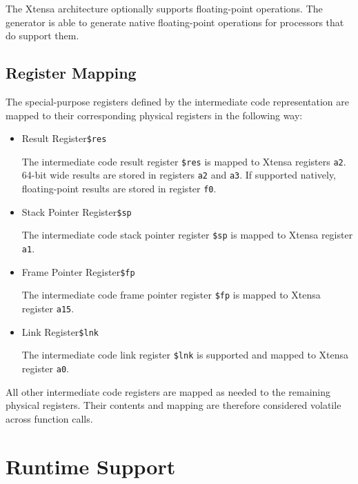 The Xtensa architecture optionally supports floating-point operations.
The generator is able to generate native floating-point operations for processors that do support them.

\subsection{Register Mapping}

The special-purpose registers defined by the intermediate code representation are mapped to their corresponding physical registers in the following way:

\begin{itemize}

\item Result Register\alignright\texttt{\$res}\nopagebreak

The intermediate code result register \texttt{\$res} is mapped to Xtensa registers \texttt{a2}.
64-bit wide results are stored in registers \texttt{a2} and \texttt{a3}.
If supported natively, floating-point results are stored in register \texttt{f0}.

\item Stack Pointer Register\alignright\texttt{\$sp}\nopagebreak

The intermediate code stack pointer register \texttt{\$sp} is mapped to Xtensa register \texttt{a1}.

\item Frame Pointer Register\alignright\texttt{\$fp}\nopagebreak

The intermediate code frame pointer register \texttt{\$fp} is mapped to Xtensa register \texttt{a15}.

\item Link Register\alignright\texttt{\$lnk}\nopagebreak

The intermediate code link register \texttt{\$lnk} is supported and mapped to Xtensa register \texttt{a0}.

\end{itemize}

All other intermediate code registers are mapped as needed to the remaining physical registers.
Their contents and mapping are therefore considered volatile across function calls.

\section{Runtime Support}

